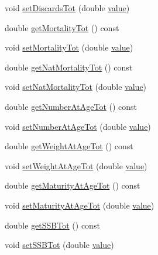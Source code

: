 \begin{DoxyCompactItemize}
\item 
void \mbox{\hyperlink{class_population_data_aff2692cdf363572efb2cb8b54af6958c}{set\+Discards\+Tot}} (double \mbox{\hyperlink{diffusion_8cpp_a4b41795815d9f3d03abfc739e666d5da}{value}})
\item 
double \mbox{\hyperlink{class_population_data_a46e481ced689ecba123bbcb52b014b81}{get\+Mortality\+Tot}} () const
\item 
void \mbox{\hyperlink{class_population_data_a7d9680fd6b96b2660500058b78bb85bc}{set\+Mortality\+Tot}} (double \mbox{\hyperlink{diffusion_8cpp_a4b41795815d9f3d03abfc739e666d5da}{value}})
\item 
double \mbox{\hyperlink{class_population_data_a0e43074d2ff0fcf89800b6958d8854dc}{get\+Nat\+Mortality\+Tot}} () const
\item 
void \mbox{\hyperlink{class_population_data_ae1efb6e7d924bac3616fd16d3873725e}{set\+Nat\+Mortality\+Tot}} (double \mbox{\hyperlink{diffusion_8cpp_a4b41795815d9f3d03abfc739e666d5da}{value}})
\item 
double \mbox{\hyperlink{class_population_data_a9454b888f6b30f2b49082244443cc46f}{get\+Number\+At\+Age\+Tot}} () const
\item 
void \mbox{\hyperlink{class_population_data_a17e51aae972c1ecb72571556f407597f}{set\+Number\+At\+Age\+Tot}} (double \mbox{\hyperlink{diffusion_8cpp_a4b41795815d9f3d03abfc739e666d5da}{value}})
\item 
double \mbox{\hyperlink{class_population_data_ad7ee743def46b7155241f62b4e572220}{get\+Weight\+At\+Age\+Tot}} () const
\item 
void \mbox{\hyperlink{class_population_data_a064edc9dd6b92f83d592b0ab46ad4e5f}{set\+Weight\+At\+Age\+Tot}} (double \mbox{\hyperlink{diffusion_8cpp_a4b41795815d9f3d03abfc739e666d5da}{value}})
\item 
double \mbox{\hyperlink{class_population_data_a4c9575b6d9c649c93a4c6cec0185a454}{get\+Maturity\+At\+Age\+Tot}} () const
\item 
void \mbox{\hyperlink{class_population_data_a81b1575deb521ecbcd6f2e466720b22e}{set\+Maturity\+At\+Age\+Tot}} (double \mbox{\hyperlink{diffusion_8cpp_a4b41795815d9f3d03abfc739e666d5da}{value}})
\item 
double \mbox{\hyperlink{class_population_data_a4b3a0faef6f579f30ad827d0b94f81d6}{get\+S\+S\+B\+Tot}} () const
\item 
void \mbox{\hyperlink{class_population_data_a3d6e75c351eec005163ffbcfb1c17cbb}{set\+S\+S\+B\+Tot}} (double \mbox{\hyperlink{diffusion_8cpp_a4b41795815d9f3d03abfc739e666d5da}{value}})

\end{DoxyCompactItemize}
